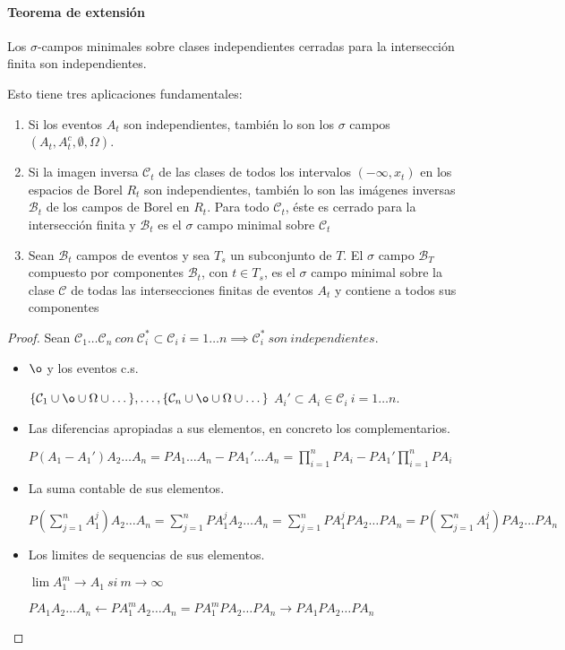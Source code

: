 \paragraph{Teorema de extensión}
\begin{theorem}
Los $\sigma$-campos minimales sobre clases independientes cerradas para la intersección finita son independientes.
\end{theorem}
Esto tiene tres aplicaciones fundamentales:
\begin{enumerate}
\item Si los eventos $A_t$ son independientes, también lo son los $\sigma$ campos $(A_t , A_t^c , \emptyset , \Omega)$.
\item Si la imagen inversa $\mathcal{C}_t$ de las clases de todos los intervalos $(-\infty, x_t)$ en los espacios de Borel $R_t$ son independientes, también lo son las imágenes inversas $\mathcal{B}_t$ de los campos de Borel en $R_t$. Para todo $\mathcal{C}_t$, éste es cerrado para la intersección finita y $\mathcal{B}_t$ es el $\sigma$ campo minimal sobre $\mathcal{C}_t$
\item Sean $\mathcal{B}_t$ campos de eventos y sea $T_s$ un subconjunto de $T$. El $\sigma$ campo $\mathcal{B}_T$ compuesto por componentes $\mathcal{B}_t$, con $t\in T_s$, es el $\sigma$ campo minimal sobre la clase $\mathcal{C}$ de todas las intersecciones finitas de eventos $A_t$ y contiene a todos sus componentes
\end{enumerate}
\begin{proof}

Sean $\mathcal{C}_1 \dots \mathcal{C}_n \ con \ \mathcal{C}_i^* \subset \mathcal{C}_i \ i=1\dots n \implies \mathcal{C}_i^* \ son \ independientes.$
\\
\begin{itemize}
\item $\o$ y los eventos c.s.

$\{\mathcal{C}_1 \cup \o \cup \Omega \cup \dots \}, \dots , \{\mathcal{C}_n \cup \o \cup \Omega \cup \dots \}$ $A_i' \subset A_i \in \mathcal{C}_i \ i=1\dots n.$
\\
\item Las diferencias apropiadas a sus elementos, en concreto los complementarios.

$P(A_1 - A_1') A_2\dots A_n = PA_1\dots A_n - PA_1'\dots A_n = \prod_{i=1}^{n}PA_{i} - PA_1'\prod_{i=1}^{n}PA_i$
\\
\item La suma contable de sus elementos.

$P(\sum_{j=1}^{n}A_1^j)A_2\dots A_n = \sum_{j=1}^{n}PA_1^jA_2\dots A_n = \sum_{j=1}^{n}PA_1^jPA_2\dots PA_n = P(\sum_{j=1}^{n}A_1^j)PA_2\dots PA_n$
\\
\item Los limites de sequencias de sus elementos.

$\lim A_{1}^m \rightarrow A_{1} \ si \ m \rightarrow \infty$

$PA_1A_2\dots A_n \leftarrow PA_1^mA_2\dots A_n = PA_1^mPA_2\dots PA_n \rightarrow PA_1PA_2\dots PA_n$
\end{itemize}

\end{proof}
